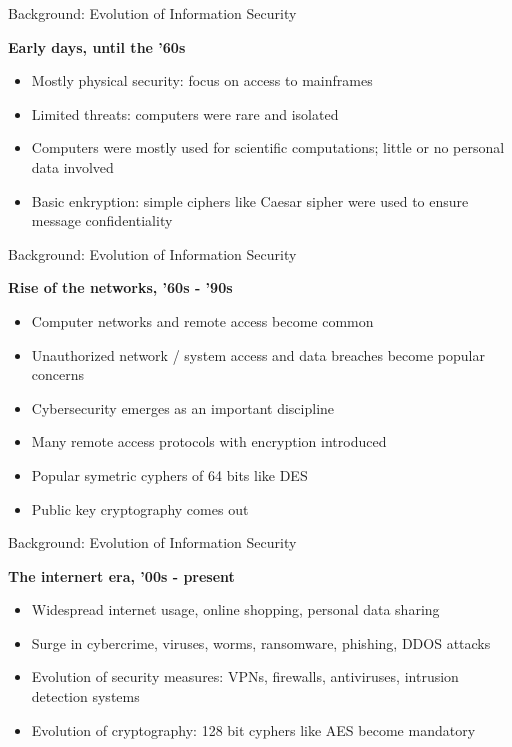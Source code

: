 \documentclass[12pt,aspectratio=169,handout]{beamer}
\begin{document}
\begin{frame}{Background: Evolution of Information Security}

\textbf{Early days, until the '60s} \vskip2mm

\begin{itemize} \setlength\itemsep{2mm}
%
\item Mostly physical security: focus on access to mainframes 
%
\item Limited threats: computers were rare and isolated
%
\item Computers were mostly used for scientific computations; little or no personal data involved
%
\item Basic enkryption: simple ciphers like Caesar sipher were used to ensure message confidentiality
%
\end{itemize}

\end{frame}


\begin{frame}{Background: Evolution of Information Security}

\textbf{Rise of the networks, '60s - '90s} \vskip2mm

\begin{itemize} \setlength\itemsep{1mm}
%
\item Computer networks and remote access become common
%
\item Unauthorized network / system access and data breaches become popular concerns
%
\item Cybersecurity emerges as an important discipline
%
\item Many remote access protocols with encryption introduced
% 
\item Popular symetric cyphers of 64 bits like DES 
%
\item Public key cryptography comes out
%
\end{itemize}

\end{frame}


\begin{frame}{Background: Evolution of Information Security}

\textbf{The internert era, '00s - present} \vskip2mm

\begin{itemize} \setlength\itemsep{2mm}
%
\item Widespread internet usage, online shopping, personal data sharing
%
\item Surge in cybercrime, viruses, worms, ransomware, phishing, DDOS attacks
%
\item Evolution of security measures: VPNs, firewalls, antiviruses, intrusion detection systems
%
\item Evolution of cryptography: 128 bit cyphers like AES become mandatory
%
\end{itemize}

\end{frame}
\end{document}

